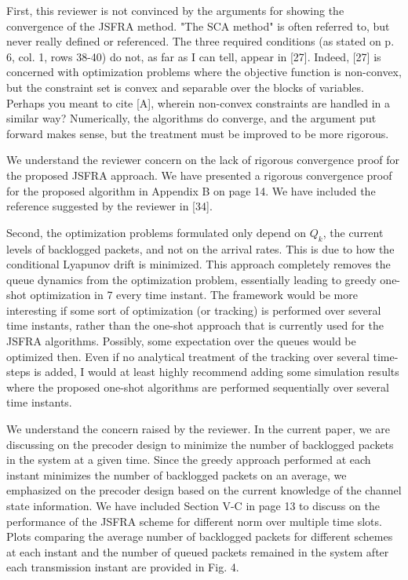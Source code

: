 \begin{itemize}

 First, this reviewer is not convinced by the arguments for showing the convergence of the JSFRA method. "The SCA method" is often referred to, but never really defined or referenced. The three required conditions (as stated on p. 6, col. 1, rows 38-40) do not, as far as I can tell, appear in [27]. Indeed, [27] is concerned with optimization problems where the objective function is non-convex, but the constraint set is convex and separable over the blocks of variables. Perhaps you meant to cite [A], wherein non-convex constraints are handled in a similar way? Numerically, the algorithms do converge, and the argument put forward makes sense, but the treatment must be improved to be more rigorous.

\resp We understand the reviewer concern on the lack of rigorous convergence proof for the proposed JSFRA approach. We have presented a rigorous convergence proof for the proposed algorithm in Appendix B on page 14. We have included the reference suggested by the reviewer in [34]. 

 Second, the optimization problems formulated only depend on $Q_k$, the current levels of backlogged packets, and not on the arrival rates. This is due to how the conditional Lyapunov drift is minimized. This approach completely removes the queue dynamics from the optimization problem, essentially leading to greedy one-shot optimization in 7
every time instant. The framework would be more interesting if some sort of optimization (or tracking) is performed over several time instants, rather than the one-shot approach that is currently used for the JSFRA algorithms. Possibly, some expectation over the queues would be optimized then. Even if no analytical treatment of the tracking over several time-steps is added, I would at least highly recommend adding some simulation results where the proposed one-shot algorithms are performed sequentially over several time instants.

\resp We understand the concern raised by the reviewer. In the current paper, we are discussing on the precoder design to minimize the number of backlogged packets in the system at a given time. Since the greedy approach performed at each instant minimizes the number of backlogged packets on an average, we emphasized on the precoder design based on the current knowledge of the channel state information. We have included Section V-C in page 13 to discuss on the performance of the JSFRA scheme for different  norm over multiple time slots. Plots comparing the average number of backlogged packets for different schemes at each instant and the number of queued packets remained in the system after each transmission instant are provided in Fig. 4.


\end{itemize}
